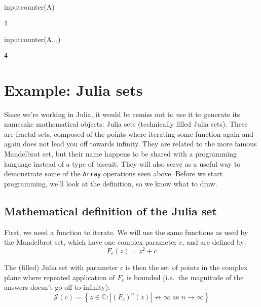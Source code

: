 \documentclass[
  letterpaper,
  DIV=11,
  numbers=noendperiod]{scrreprt}
\newenvironment{Shaded}{\begin{snugshade}}{\end{snugshade}}
\newcommand{\FunctionTok}[1]{\textcolor[rgb]{0.28,0.35,0.67}{#1}}
\newcommand{\NormalTok}[1]{\textcolor[rgb]{0.00,0.23,0.31}{#1}}
\newcommand{\OperatorTok}[1]{\textcolor[rgb]{0.37,0.37,0.37}{#1}}
\begin{document}
\begin{Shaded}
\begin{Highlighting}[]
\FunctionTok{inputcounter}\NormalTok{(A)}
\end{Highlighting}
\end{Shaded}

\begin{verbatim}
1
\end{verbatim}

\begin{Shaded}
\begin{Highlighting}[]
\FunctionTok{inputcounter}\NormalTok{(A}\OperatorTok{...}\NormalTok{)}
\end{Highlighting}
\end{Shaded}

\begin{verbatim}
4
\end{verbatim}

\hypertarget{example-julia-sets}{%
\section{Example: Julia sets}\label{example-julia-sets}}

Since we're working in Julia, it would be remiss not to use it to
generate its namesake mathematical objects: Julia sets (technically
filled Julia sets). These are fractal sets, composed of the points where
iterating some function again and again does not lead you off towards
infinity. They are related to the more famous Mandelbrot set, but their
name happens to be shared with a programming language instead of a type
of biscuit. They will also serve as a useful way to demonstrate some of
the \texttt{Array} operations seen above. Before we start programming,
we'll look at the definition, so we know what to draw.

\hypertarget{mathematical-definition-of-the-julia-set}{%
\subsection{Mathematical definition of the Julia
set}\label{mathematical-definition-of-the-julia-set}}

First, we need a function to iterate. We will use the same functions as
used by the Mandelbrot set, which have one complex parameter \(c\), and
are defined by: \[
F_c(z) = z^2 + c
\]

The (filled) Julia set with parameter \(c\) is then the set of points in
the complex plane where repeated application of \(F_c\) is bounded
(i.e.~the magnitude of the answers doesn't go off to infinity): \[
\mathcal{J}(c) = \left\{ z \in \mathbb{C} : \left| (F_c)^n(z) \right| \not\to \infty \text{ as } n \to \infty \right\}
\]
\end{document}

